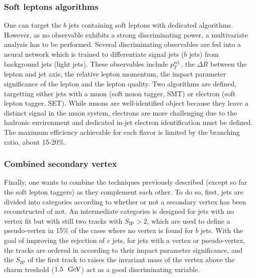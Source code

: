 
        \subsubsection{Soft leptons algorithms}

    One can target the $b$ jets containing soft leptons with dedicated algorithms. However,
    as no observable exhibits a strong discriminating power, a multivariate analysis
    has to be performed. Several discriminating observables are fed into a neural network
    which is trained to differentiate signal jets ($b$ jets) from background jets (light jets).
    These observables include $p_T^\text{rel.}$, the $\Delta R$ between the lepton and
    jet axis, the relative lepton momentum, the impact parameter significance of the lepton
    and the lepton quality. Two algorithms are defined, targetting either jets with a
    muon (soft muon tagger, SMT) or electron (soft lepton tagger, SET). While muons are
    well-identified object because they leave a distinct signal in the muon system,
    electrons are more challenging due to the hadronic environment and dedicated in-jet
    electron identification must be defined. The maximum efficiency achievable for each
    flavor is limited by the branching ratio, about 15-20\%.


        \subsubsection{Combined secondary vertex}

    Finally, one wants to combine the techniques previously described (except so far the
    soft lepton taggers) as they complement each other. To do so, first, jets are divided
    into categories according to whether or not a secondary vertex has been reconstructed
    of not. An intermediate categories is designed for jets with no vertex fit but
    with still two tracks with $S_\text{IP} > 2$, which are used to define a pseudo-vertex
    in 15\% of the cases where no vertex is found for $b$ jets.
    With the goal of improving the rejection of $c$ jets, for jets with a vertex or pseudo-vertex,
    the tracks are ordered in according to their impact parameter significance, and the
    $S_\text{IP}$ of the first track to raises the invariant mass of the vertex above
    the charm treshold ($1.5~~\text{GeV}$) act as a good discriminating variable.


